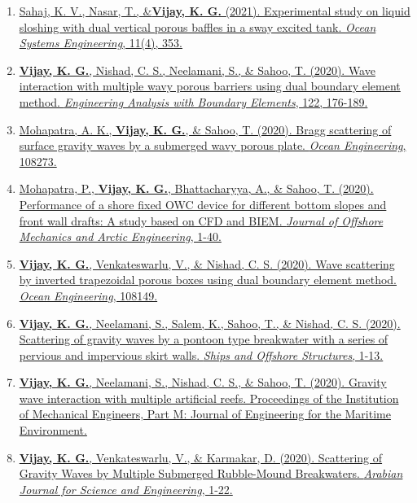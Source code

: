 \begin{enumerate}[label=\protect\circled{\arabic*}]
\item \href{https://doi.org/10.12989/ose.2021.11.4.353}{%
Sahaj, K. V., Nasar, T., \&\textbf{Vijay, K. G.} (2021). Experimental study on liquid sloshing with dual vertical porous baffles in a sway excited tank. \textit{Ocean Systems Engineering}, 11(4), 353.}

\item \href{https://doi.org/10.1016/j.enganabound.2020.10.019}{%
\textbf{Vijay, K. G.}, Nishad, C. S., Neelamani, S., \& Sahoo, T. (2020). Wave interaction with multiple wavy porous barriers using dual boundary element method. \textit{Engineering Analysis with Boundary Elements}, 122, 176-189.}

\item \href{https://doi.org/10.1016/j.oceaneng.2020.108273}{%
Mohapatra, A. K., \textbf{Vijay, K. G.}, \& Sahoo, T. (2020). Bragg scattering of surface gravity waves by a submerged wavy porous plate. \textit{Ocean Engineering}, 108273.}

\item \href{https://doi.org/10.1115/1.4048789}{%
Mohapatra, P., \textbf{Vijay, K. G.}, Bhattacharyya, A., \& Sahoo, T. (2020). Performance of a shore fixed OWC device for different bottom slopes and front wall drafts: A study based on CFD and BIEM. \textit{Journal of Offshore Mechanics and Arctic Engineering}, 1-40.} 

\item \href{https://doi.org/10.1016/j.oceaneng.2020.108149}{%
\textbf{Vijay, K. G.}, Venkateswarlu, V., \& Nishad, C. S. (2020). Wave scattering by inverted trapezoidal porous boxes using dual boundary element method. \textit{Ocean Engineering}, 108149.}

\item \href{https://doi.org/10.1080/17445302.2020.1827630}{%
\textbf{Vijay, K. G.}, Neelamani, S., Salem, K., Sahoo, T., \& Nishad, C. S. (2020). Scattering of gravity waves by a pontoon type breakwater with a series of pervious and impervious skirt walls. \textit{Ships and Offshore Structures}, 1-13.}

\item \href{https://doi.org/10.1177/1475090220960848}{%
\textbf{Vijay, K. G.}, Neelamani, S., Nishad, C. S., \& Sahoo, T. (2020). Gravity wave interaction with multiple artificial reefs. Proceedings of the Institution of Mechanical Engineers, Part M: Journal of Engineering for the Maritime Environment.}

\item \href{https://doi.org/10.1007/s13369-020-04767-1}{%
\textbf{Vijay, K. G.}, Venkateswarlu, V., \& Karmakar, D. (2020). Scattering of Gravity Waves by Multiple Submerged Rubble-Mound Breakwaters. \textit{Arabian Journal for Science and Engineering}, 1-22.}


\end{enumerate}
